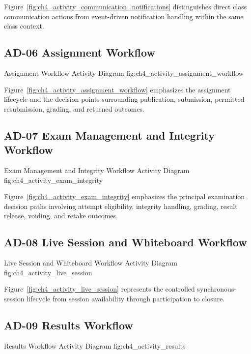 Figure~\ref{fig:ch4_activity_communication_notifications} distinguishes direct
class communication actions from event-driven notification handling within the
same class context.

\subsection*{AD-06 Assignment Workflow}

\EduActivityFigureReadable{\EduActivityAssignmentWorkflowDiagram}
  {Assignment Workflow Activity Diagram}
  {fig:ch4_activity_assignment_workflow}

Figure~\ref{fig:ch4_activity_assignment_workflow} emphasizes the assignment
lifecycle and the decision points surrounding publication, submission,
permitted resubmission, grading, and returned outcomes.

\subsection*{AD-07 Exam Management and Integrity Workflow}

\EduActivityFigureTall{\EduActivityExamIntegrityWorkflowDiagram}
  {Exam Management and Integrity Workflow Activity Diagram}
  {fig:ch4_activity_exam_integrity}

Figure~\ref{fig:ch4_activity_exam_integrity} emphasizes the principal
examination decision paths involving attempt eligibility, integrity handling,
grading, result release, voiding, and retake outcomes.

\subsection*{AD-08 Live Session and Whiteboard Workflow}

\EduActivityFigure{\EduActivityLiveSessionWorkflowDiagram}
  {Live Session and Whiteboard Workflow Activity Diagram}
  {fig:ch4_activity_live_session}

Figure~\ref{fig:ch4_activity_live_session} represents the controlled
synchronous-session lifecycle from session availability through participation
to closure.

\subsection*{AD-09 Results Workflow}

\EduActivityFigureTall{\EduActivityResultsWorkflowDiagram}
  {Results Workflow Activity Diagram}
  {fig:ch4_activity_results}

